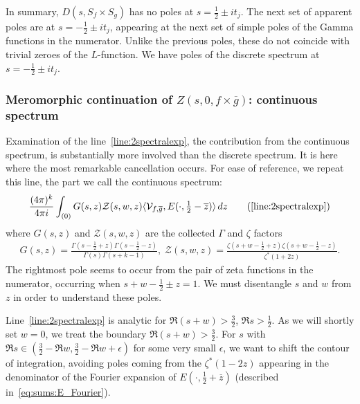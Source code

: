 In summary, $D(s, S_f \times S_g)$ has no poles at $s = \frac{1}{2} \pm it_j$.
The next set of apparent poles are at $s = -\frac{1}{2} \pm it_j$, appearing at the next
set of simple poles of the Gamma functions in the numerator.
Unlike the previous poles, these do not coincide with trivial zeroes of the $L$-function.
We have poles of the discrete spectrum at $s = -\frac{1}{2} \pm it_j$.



\subsubsection{Meromorphic continuation of $Z(s, 0, f\times \overline{g})$: continuous spectrum}


Examination of the line~\eqref{line:2spectralexp}, the contribution from the continuous
spectrum, is substantially more involved than the discrete spectrum.
It is here where the most remarkable cancellation occurs.
For ease of reference, we repeat this line, the part we call the continuous spectrum:
\begin{equation}\label{eq:line2-repeat}
  \frac{(4\pi)^{k}}{4\pi i}\int_{(0)} G(s, z) \mathcal{Z}(s,w,z) \langle
  \mathcal{V}_{f,\overline{g} },E(\cdot,\tfrac{1}{2}-\overline{z})\rangle \,dz
  \tag{\ref{line:2spectralexp}}
\end{equation} %
where $G(s, z)$ and $\mathcal{Z} (s,w,z)$ are the collected $\Gamma$ and $\zeta$ factors
\begin{align}
  G(s, z) = \frac{\Gamma(s - \tfrac{1}{2} + z)\Gamma(s - \tfrac{1}{2} -
  z)}{\Gamma(s)\Gamma(s+k-1)},
  \; \mathcal{Z}(s,w,z) = \frac{\zeta(s + w -\frac{1}{2} + z)\zeta(s + w -\frac{1}{2} -
  z)}{\zeta^*(1+2z)}.
\end{align}
The rightmost pole seems to occur from the pair of zeta functions in the numerator,
occurring when $s + w - \frac{1}{2} \pm z = 1$. We must disentangle $s$ and $w$ from $z$
in order to understand these poles.


Line~\eqref{line:2spectralexp} is analytic for $\Re (s+w) > \frac{3}{2}$, $\Re s >
\tfrac{1}{2}$.
As we will shortly set $w = 0$, we treat the boundary $\Re (s+w) > \frac{3}{2}$.
For $s$ with $\Re s \in (\frac{3}{2} - \Re w, \frac{3}{2} - \Re w + \epsilon)$ for some
very small $\epsilon$, we want to shift the contour of integration, avoiding poles coming
from the $\zeta^*(1 -2z)$ appearing in the denominator of the Fourier expansion of
$E(\cdot,\frac{1}{2}+\overline{z})$ (described in~\eqref{eq:sums:E_Fourier}).



